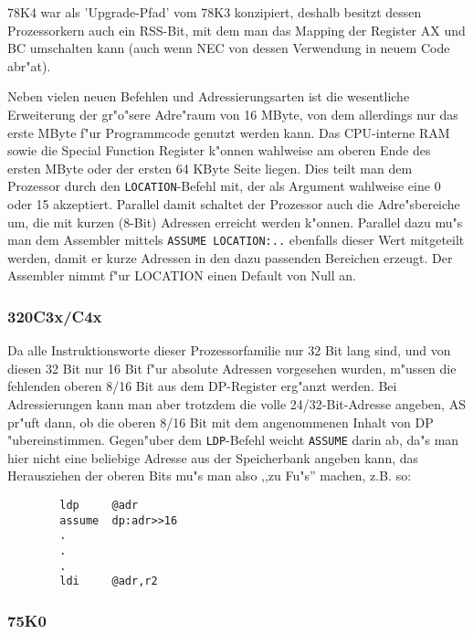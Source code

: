 \documentclass[12pt,a4paper,twoside]{report}
\newcommand{\tty}[1]{{\tt #1}}
\begin{document}
78K4 war als 'Upgrade-Pfad' vom 78K3 konzipiert, deshalb besitzt
dessen Prozessorkern auch ein RSS-Bit, mit dem man das Mapping
der Register AX und BC umschalten kann (auch wenn NEC von dessen
Verwendung in neuem Code abr"at).

Neben vielen neuen Befehlen und Adressierungsarten ist die
wesentliche Erweiterung der gr"o"sere Adre"raum von 16 MByte, von
dem allerdings nur das erste MByte f"ur Programmcode genutzt
werden kann.  Das CPU-interne RAM sowie die Special Function
Register k"onnen wahlweise am oberen Ende des ersten MByte oder
der ersten 64 KByte Seite liegen.  Dies teilt man dem Prozessor
durch den \tty{LOCATION}-Befehl mit, der als Argument wahlweise
eine 0 oder 15 akzeptiert.  Parallel damit schaltet der Prozessor
auch die Adre"sbereiche um, die mit kurzen (8-Bit) Adressen
erreicht werden k"onnen.  Parallel dazu mu"s man dem Assembler
mittels \tty{ASSUME LOCATION:..} ebenfalls dieser Wert mitgeteilt
werden, damit er kurze Adressen in den dazu passenden Bereichen
erzeugt.  Der Assembler nimmt f"ur LOCATION einen Default von Null
an.


\subsubsection{320C3x/C4x}

Da alle Instruktionsworte dieser Prozessorfamilie nur 32 Bit lang
sind, und von diesen 32 Bit nur 16 Bit f"ur absolute Adressen vorgesehen
wurden, m"ussen die fehlenden oberen 8/16 Bit aus dem DP-Register
erg"anzt werden.  Bei Adressierungen kann man aber trotzdem die volle
24/32-Bit-Adresse angeben, AS pr"uft dann, ob die oberen 8/16 Bit mit dem
angenommenen Inhalt von DP "ubereinstimmen.  Gegen"uber dem \tty{LDP}-Befehl
weicht \tty{ASSUME} darin ab, da"s man hier nicht eine beliebige Adresse
aus der Speicherbank angeben kann, das Herausziehen der oberen Bits
mu"s man also ,,zu Fu"s'' machen, z.B. so:
\begin{verbatim}
        ldp     @adr
        assume  dp:adr>>16
        .
        .
        .
        ldi     @adr,r2
\end{verbatim}


\subsubsection{75K0}
\end{document}
